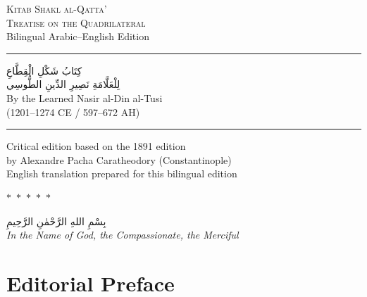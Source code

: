 \documentclass[11pt,a4paper]{article}
\theoremstyle{plain}
\theoremstyle{definition}
\theoremstyle{remark}
\newcommand{\shortline}{\noindent\rule{0.5\textwidth}{0.4pt}\par}
\newcommand{\ar}[1]{{\arabicfont\beginR #1\endR}}
\newcommand{\dblornament}{\begin{center}\textcolor{goldaccent}{$\ast$~$\ast$~$\ast$~$\ast$~$\ast$}\end{center}}
\begin{document}
\thispagestyle{empty}
\begin{center}
\vspace*{1.5cm}

{\fontsize{22}{28}\selectfont\textsc{Kitab Shakl al-Qatta'}}\\[0.5cm]
{\Large\textsc{Treatise on the Quadrilateral}}\\[0.3cm]
{\large Bilingual Arabic--English Edition}\\[1cm]

\shortline

\vspace{0.5cm}
{\Large\ar{كِتَابُ شَكْلِ الْقِطَّاعِ}}\\[0.3cm]
{\large\ar{لِلْعَلَّامَةِ نَصِيرِ الدِّينِ الطُّوسِي}}\\[0.5cm]
{\normalsize By the Learned Nasir al-Din al-Tusi}\\[0.1cm]
{\normalsize (1201--1274 CE / 597--672 AH)}\\[1cm]

\shortline

\vspace{0.5cm}
{\small Critical edition based on the 1891 edition}\\[0.1cm]
{\small by Alexandre Pacha Caratheodory (Constantinople)}\\[0.3cm]
{\small English translation prepared for this bilingual edition}\\[1cm]

\dblornament

\vspace{0.5cm}
{\small\ar{بِسْمِ اللهِ الرَّحْمٰنِ الرَّحِيمِ}}\\[0.2cm]
{\small\textit{In the Name of God, the Compassionate, the Merciful}}\\[0.5cm]

\end{center}
\clearpage

\tableofcontents
\clearpage

\section*{Editorial Preface}
\end{document}
